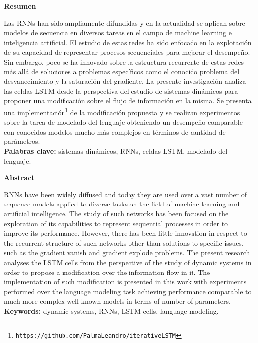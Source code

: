 \documentclass{article}
\begin{document}
	\pagebreak
	\vspace*{\fill}
	
	\begin{center}
		\Large\textbf{Resumen}
		\quad\linebreak
		
		
		\normalsize
	\end{center}	
	\normalsize
	
	Las RNNs han sido ampliamente difundidas y en la actualidad se aplican sobre modelos de secuencia en diversos tareas en el campo de machine learning e inteligencia artificial. El estudio de estas redes ha sido enfocado en la explotación de su capacidad de representar procesos secuenciales para mejorar el desempeño. Sin embargo, poco se ha innovado sobre la estructura recurrente de estas redes más allá de soluciones a problemas específicos como el conocido problema del desvanecimiento y la saturación del gradiente. La presente investigación analiza las celdas LSTM desde la perspectiva del estudio de sistemas dinámicos para proponer una modificación sobre el flujo de información en la misma. Se presenta una implementación\footnote{\texttt{https://github.com/PalmaLeandro/iterativeLSTM}\label{footnote1}} de la modificación propuesta y se realizan experimentos sobre la tarea de modelado del lenguaje obteniendo un desempeño comparable con conocidos modelos mucho más complejos en términos de cantidad de parámetros.\\
	\textbf{Palabras clave:} sistemas dinámicos, RNNs, celdas LSTM, modelado del lenguaje.\\
	
	
	\vspace*{\fill}
	\pagebreak
	\vspace*{\fill}
	\begin{center}
		\Large\textbf{Abstract}\\
	\end{center}	
	\normalsize
	RNNs have been widely diffused and today they are used over a vast number of sequence models applied to diverse tasks on the field of machine learning and artificial intelligence. The study of such networks has been focused on the exploration of its capabilities to represent sequential processes in order to improve its performance. However, there has been little innovation in respect to the recurrent structure of such networks other than solutions to specific issues, such as the gradient vanish and gradient explode problems. The present research analyses the LSTM cells from the perspective of the study of dynamic systems in order to propose a modification over the information flow in it. The implementation of such modification is presented in this work with experiments performed over the language modeling task achieving performance comparable to much more complex well-known models in terms of number of parameters.\\
	\textbf{Keywords:} dynamic systems, RNNs, LSTM cells, language modeling.\\
	
\end{document}

